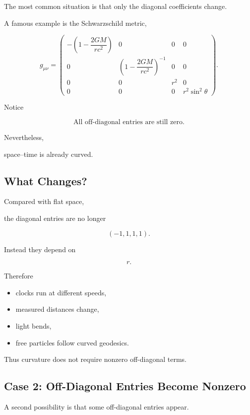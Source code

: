 \documentclass[12pt,a4paper]{article}
\theoremstyle{notespace}
\begin{document}
The most common situation is that only the diagonal coefficients change.

A famous example is the Schwarzschild metric,

\[
g_{\mu\nu}
=
\begin{pmatrix}
	-\left(1-\dfrac{2GM}{rc^2}\right)
	&
	0
	&
	0
	&
	0
	\\
	0
	&
	\left(1-\dfrac{2GM}{rc^2}\right)^{-1}
	&
	0
	&
	0
	\\
	0
	&
	0
	&
	r^2
	&
	0
	\\
	0
	&
	0
	&
	0
	&
	r^2\sin^2\theta
\end{pmatrix}.
\]

Notice

\[
\boxed{
	\text{All off-diagonal entries are still zero.}
}
\]

Nevertheless,

space--time is already curved.


\subsection{What Changes?}

Compared with flat space,

the diagonal entries are no longer

\[
(-1,1,1,1).
\]

Instead they depend on

\[
r.
\]

Therefore

\begin{itemize}
	\item clocks run at different speeds,
	\item measured distances change,
	\item light bends,
	\item free particles follow curved geodesics.
\end{itemize}

Thus curvature does not require nonzero off-diagonal terms.


\subsection{Case 2: Off-Diagonal Entries Become Nonzero}

A second possibility is that some off-diagonal entries appear.
\end{document}
